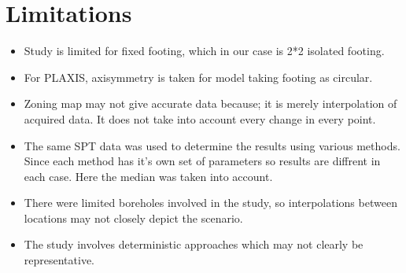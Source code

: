 \section{Limitations}
\begin{itemize}
  \item	Study is limited for fixed footing, which in our case is 2*2 isolated footing.
  \item For PLAXIS, axisymmetry is taken for model taking footing as circular.
  \item	Zoning map may not give accurate data because; it is merely interpolation of acquired data. It does not take into account every change in every point.
  \item The same SPT data was used to determine the results using various methods. Since each method has it's own set of parameters so results are diffrent in each case. Here the median was taken into account.
  \item	There were limited boreholes involved in the study, so interpolations between locations may not closely depict the scenario.
  \item	The study involves deterministic approaches which may not clearly be representative.
\end{itemize}
